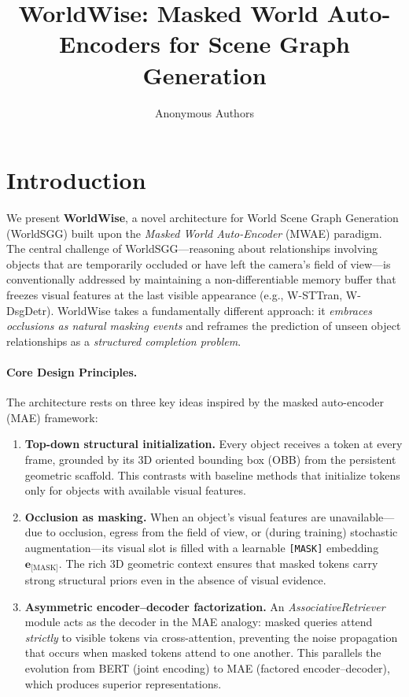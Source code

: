 \documentclass{article}
\title{WorldWise: Masked World Auto-Encoders for Scene Graph Generation}
\author{Anonymous Authors}
\newcommand{\mat}[1]{\bm{#1}}
\begin{document}
\maketitle

\section{Introduction}
\label{sec:intro}

We present \textbf{WorldWise}, a novel architecture for World Scene Graph Generation (WorldSGG) built upon the \emph{Masked World Auto-Encoder} (MWAE) paradigm.  The central challenge of WorldSGG---reasoning about relationships involving objects that are temporarily occluded or have left the camera's field of view---is conventionally addressed by maintaining a non-differentiable memory buffer that freezes visual features at the last visible appearance (e.g., W-STTran, W-DsgDetr).  WorldWise takes a fundamentally different approach: it \emph{embraces occlusions as natural masking events} and reframes the prediction of unseen object relationships as a \emph{structured completion problem}.

\paragraph{Core Design Principles.}
The architecture rests on three key ideas inspired by the masked auto-encoder (MAE) framework:
\begin{enumerate}
    \item \textbf{Top-down structural initialization.}  Every object receives a token at every frame, grounded by its 3D oriented bounding box (OBB) from the persistent geometric scaffold.  This contrasts with baseline methods that initialize tokens only for objects with available visual features.

    \item \textbf{Occlusion as masking.}  When an object's visual features are unavailable---due to occlusion, egress from the field of view, or (during training) stochastic augmentation---its visual slot is filled with a learnable \texttt{[MASK]} embedding $\mat{e}_{\text{[MASK]}}$.  The rich 3D geometric context ensures that masked tokens carry strong structural priors even in the absence of visual evidence.

    \item \textbf{Asymmetric encoder--decoder factorization.}  An \emph{AssociativeRetriever} module acts as the decoder in the MAE analogy: masked queries attend \emph{strictly} to visible tokens via cross-attention, preventing the noise propagation that occurs when masked tokens attend to one another.  This parallels the evolution from BERT (joint encoding) to MAE (factored encoder--decoder), which produces superior representations.
\end{enumerate}
\end{document}
